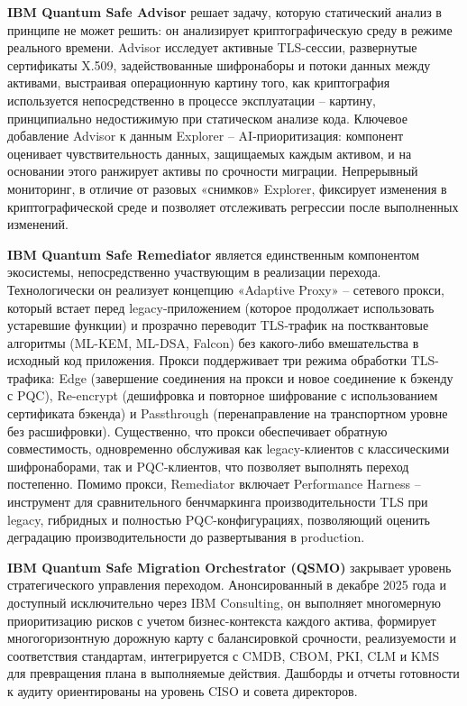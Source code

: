 \documentclass{itmo-vkr}
\begin{document}
	
	\textbf{IBM Quantum Safe Advisor} решает задачу, которую статический анализ в принципе не может решить: он анализирует криптографическую среду в режиме реального времени. Advisor исследует активные TLS-сессии, развернутые сертификаты X.509, задействованные шифронаборы и потоки данных между активами, выстраивая операционную картину того, как криптография используется непосредственно в процессе эксплуатации -- картину, принципиально недостижимую при статическом анализе кода. Ключевое добавление Advisor к данным Explorer -- AI-приоритизация: компонент оценивает чувствительность данных, защищаемых каждым активом, и на основании этого ранжирует активы по срочности миграции. Непрерывный мониторинг, в отличие от разовых «снимков» Explorer, фиксирует изменения в криптографической среде и позволяет отслеживать регрессии после выполненных изменений.
	
	\textbf{IBM Quantum Safe Remediator} является единственным компонентом экосистемы, непосредственно участвующим в реализации перехода. Технологически он реализует концепцию «Adaptive Proxy» -- сетевого прокси, который встает перед legacy-приложением (которое продолжает использовать устаревшие функции) и прозрачно переводит TLS-трафик на постквантовые алгоритмы (ML-KEM, ML-DSA, Falcon) без какого-либо вмешательства в исходный код приложения. Прокси поддерживает три режима обработки TLS-трафика: Edge (завершение соединения на прокси и новое соединение к бэкенду с PQC), Re-encrypt (дешифровка и повторное шифрование с использованием сертификата бэкенда) и Passthrough (перенаправление на транспортном уровне без расшифровки). Существенно, что прокси обеспечивает обратную совместимость, одновременно обслуживая как legacy-клиентов с классическими шифронаборами, так и PQC-клиентов, что позволяет выполнять переход постепенно. Помимо прокси, Remediator включает Performance Harness -- инструмент для сравнительного бенчмаркинга производительности TLS при legacy, гибридных и полностью PQC-конфигурациях, позволяющий оценить деградацию производительности до развертывания в production.
	
	
	\textbf{IBM Quantum Safe Migration Orchestrator (QSMO)} закрывает уровень стратегического управления переходом. Анонсированный в декабре 2025 года и доступный исключительно через IBM Consulting, он выполняет многомерную приоритизацию рисков с учетом бизнес-контекста каждого актива, формирует многогоризонтную дорожную карту с балансировкой срочности, реализуемости и соответствия стандартам, интегрируется с CMDB, CBOM, PKI, CLM и KMS для превращения плана в выполняемые действия. Дашборды и отчеты готовности к аудиту ориентированы на уровень CISO и совета директоров.
	
\end{document}
